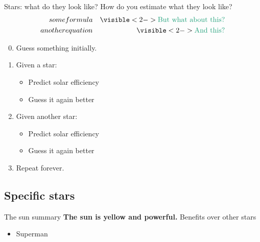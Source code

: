 \begin{frame}{Stars: what do they look like?}
How do you estimate what they look like?
\begin{align*}
some& formula  &\myaddthis{\text{But what about this?}}\\ \bigskip
another & equation &\myaddthis{\text{And this?}}
\end{align*}

\begin{enumerate}
\setcounter{enumi}{-1}
    \item Guess something initially.
    \bigskip
    \item Given a star:
    \begin{itemize}
        \smallskip
        \item Predict solar efficiency 
        \smallskip
        \item Guess it again  better
    \end{itemize}
    \bigskip
    \item Given another star:
    \begin{itemize}
        \smallskip
        \item Predict solar efficiency 
        \smallskip
        \item Guess it again  better
    \end{itemize}
    \bigskip
    \item Repeat forever.
\end{enumerate}

\end{frame}


\subsection{Specific stars}

\begin{frame}{The sun summary}
\textbf{The sun is yellow and powerful.}
\vfill
Benefits over other stars
\begin{itemize}
    \item Superman
\end{itemize}
\vfill
\end{frame}

